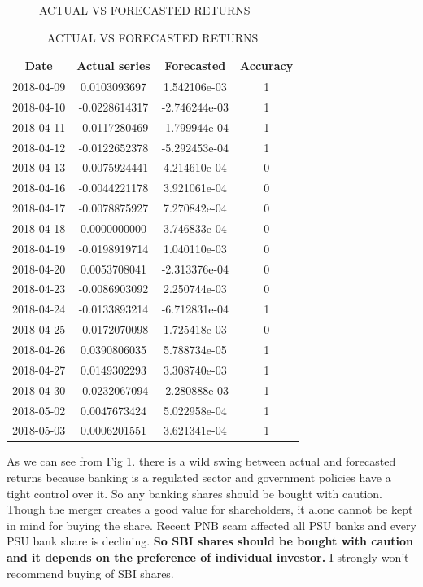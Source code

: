 \documentclass[a4paper, 12pt]{extarticle}
\begin{document}
{\begin{figure}[H]
\caption{ACTUAL VS FORECASTED RETURNS}
\label{fig:forecast}
\end{figure}
\newpage
\begin{table}[H]
\centering
\begin{tabular}{|c|c|c|c|}
\hline Date & Actual series & Forecasted & Accuracy \\
\hline 2018-04-09 & 0.0103093697 & 1.542106e-03 & 1\\
\hline 2018-04-10 & -0.0228614317 & -2.746244e-03 & 1\\
\hline 2018-04-11 & -0.0117280469 & -1.799944e-04 & 1\\
\hline 2018-04-12 & -0.0122652378 & -5.292453e-04 & 1\\
\hline 2018-04-13 & -0.0075924441 & 4.214610e-04 & 0\\
\hline 2018-04-16 & -0.0044221178 & 3.921061e-04 & 0\\
\hline 2018-04-17 & -0.0078875927 & 7.270842e-04 & 0\\
\hline 2018-04-18 & 0.0000000000  & 3.746833e-04 & 0\\
\hline 2018-04-19 & -0.0198919714  & 1.040110e-03 & 0\\
\hline 2018-04-20 & 0.0053708041 & -2.313376e-04 & 0\\
\hline 2018-04-23 & -0.0086903092  & 2.250744e-03 & 0\\
\hline 2018-04-24 & -0.0133893214 & -6.712831e-04 & 1\\
\hline 2018-04-25 & -0.0172070098  & 1.725418e-03 & 0\\
\hline 2018-04-26 & 0.0390806035  & 5.788734e-05 & 1\\
\hline 2018-04-27 & 0.0149302293  & 3.308740e-03 & 1\\
\hline 2018-04-30 & -0.0232067094 & -2.280888e-03 & 1\\
\hline 2018-05-02 & 0.0047673424  & 5.022958e-04 & 1\\
\hline 2018-05-03 & 0.0006201551  & 3.621341e-04 & 1\\
\hline
\end{tabular}
\caption{ACTUAL VS FORECASTED RETURNS}
\label{table:act_vs_forecast}
\end{table}
\par As we can see from Fig \ref{fig:forecast}. there is a wild swing between actual and forecasted returns because banking is a regulated sector and government policies have a tight control over it. So any banking shares should be bought with caution. Though the merger creates a good value for shareholders, it alone cannot be kept in mind for buying the share. Recent PNB scam affected all PSU banks and every PSU bank share is declining. \textbf{So SBI shares should be bought with caution and it depends on the preference of individual investor.} I strongly won't recommend buying of SBI shares.

}
\end{document}
